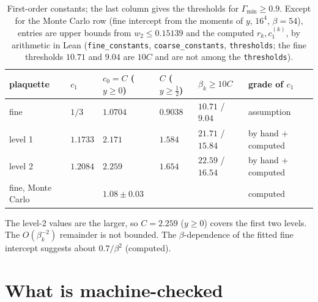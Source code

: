 \documentclass[11pt,a4paper]{article}
\theoremstyle{definition}
\theoremstyle{remark}
\newcommand{\code}[1]{\texttt{#1}}
\begin{document}
\begin{table}[ht]\centering\small
\caption{First-order constants; the last column gives the thresholds for $\Gamma_{\min}\ge0.9$. Except for the Monte Carlo row (fine intercept from the moments of $y$, $16^4$, $\beta=54$), entries are upper bounds from $w_2\le0.15139$ and the computed $r_k,c_1^{(k)}$, by arithmetic in Lean (\code{fine\_constants}, \code{coarse\_constants}, \code{thresholds}; the fine thresholds $10.71$ and $9.04$ are $10C$ and are not among the \code{thresholds}).}\label{tab:const}
\begin{tabular}{@{}llllll@{}}\toprule
plaquette & $c_1$ & $c_0=C$ ($y\ge0$) & $C$ ($y\ge\frac12$) & $\beta_k\ge10C$ & grade of $c_1$\\\midrule
fine & $1/3$ & $1.0704$ & $0.9038$ & $10.71$ / $9.04$ & assumption\\
level 1 & $1.1733$ & $2.171$ & $1.584$ & $21.71$ / $15.84$ & by hand + computed\\
level 2 & $1.2084$ & $2.259$ & $1.654$ & $22.59$ / $16.54$ & by hand + computed\\\midrule
fine, Monte Carlo & & $1.08\pm0.03$ & & & computed\\\bottomrule
\end{tabular}
\end{table}

The level-2 values are the larger, so $C=2.259$ ($y\ge0$) covers the first two levels. The $O(\beta_k^{-2})$ remainder is not bounded. The $\beta$-dependence of the fitted fine intercept suggests about $0.7/\beta^2$ (computed).



\section{What is machine-checked}\label{sec:lean}
\end{document}
